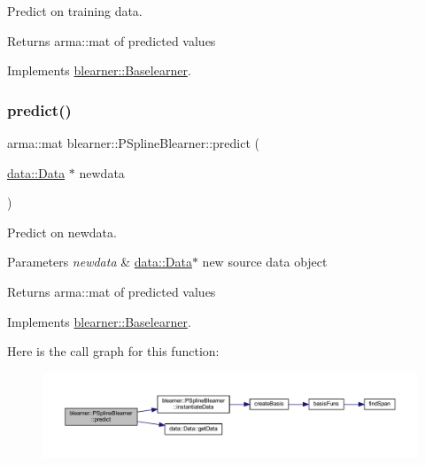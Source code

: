 Predict on training data. 

\begin{DoxyReturn}{Returns}
{\ttfamily arma\+::mat} of predicted values 
\end{DoxyReturn}


Implements \hyperlink{classblearner_1_1_baselearner_ab37986047db43c84420fef2cef7fc20d}{blearner\+::\+Baselearner}.

\mbox{\label{classblearner_1_1_p_spline_blearner_a9d35aeb36c403c167fb7519379825873}} 
\subsubsection{\texorpdfstring{predict()}{predict()}\hspace{0.1cm}{\footnotesize\ttfamily [2/2]}}
{\footnotesize\ttfamily arma\+::mat blearner\+::\+P\+Spline\+Blearner\+::predict (\begin{DoxyParamCaption}\item[{\hyperlink{classdata_1_1_data}{data\+::\+Data} $\ast$}]{newdata }\end{DoxyParamCaption})\hspace{0.3cm}{\ttfamily [virtual]}}



Predict on newdata. 


\begin{DoxyParams}{Parameters}
{\em newdata} & {\ttfamily \hyperlink{classdata_1_1_data}{data\+::\+Data}$\ast$} new source data object\\
\hline
\end{DoxyParams}
\begin{DoxyReturn}{Returns}
{\ttfamily arma\+::mat} of predicted values 
\end{DoxyReturn}


Implements \hyperlink{classblearner_1_1_baselearner_ae2ef5e018783578e02b3b5a33fa94eae}{blearner\+::\+Baselearner}.

Here is the call graph for this function\+:\nopagebreak
\begin{figure}[H]
\begin{center}
\leavevmode
\includegraphics[width=350pt]{classblearner_1_1_p_spline_blearner_a9d35aeb36c403c167fb7519379825873_cgraph}
\end{center}
\end{figure}
\mbox{\label{classblearner_1_1_p_spline_blearner_aa5c18ceb8396ffce556588486d574be8}} 
